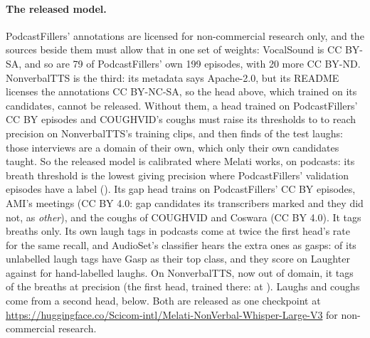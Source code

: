 \documentclass[10pt]{article}
\begin{document}
\paragraph{The released model.} PodcastFillers' annotations are licensed for non-commercial research only, and
the sources beside them must allow that in one set of weights: VocalSound is CC BY-SA, and so are 79 of
PodcastFillers' own 199 episodes, with 20 more CC BY-ND. NonverbalTTS is the third: its metadata says Apache-2.0,
but its README licenses the annotations CC BY-NC-SA, so the head above, which trained on its candidates, cannot be
released. Without them, a head trained on PodcastFillers' CC BY episodes and COUGHVID's coughs
\citep{orlandic2021coughvid} must raise its thresholds to  to reach  precision on
NonverbalTTS's training clips, and then finds  of the test laughs: those interviews are a
domain of their own, which only their own candidates taught. So the released model is calibrated where Melati
works, on podcasts: its breath threshold is the lowest giving  precision where PodcastFillers'
validation episodes have a label (). Its gap head trains on
PodcastFillers' CC BY episodes, AMI's meetings \citep{carletta2005ami} (CC BY 4.0:  gap candidates
its transcribers marked and  they did not, as \emph{other}), and the coughs of COUGHVID and Coswara
\citep{bhattacharya2023coswara} (CC BY 4.0). It tags breaths only. Its own laugh tags in podcasts come at twice the
first head's rate for the same recall, and AudioSet's classifier hears the extra ones as gasps:
 of its unlabelled laugh tags have Gasp as their top class, and they score
 on Laughter against  for hand-labelled laughs. On NonverbalTTS, now
out of domain, it tags  of the breaths at  precision (the first
head, trained there:  at ). Laughs and coughs come from a
second head, below. Both are released as one checkpoint at
\url{https://huggingface.co/Scicom-intl/Melati-NonVerbal-Whisper-Large-V3} for non-commercial research.
\end{document}

